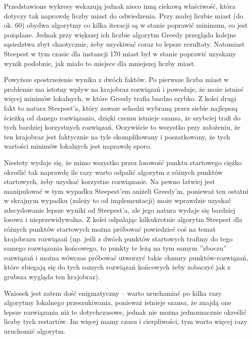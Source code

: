 Przedstawione wykresy wskazują jednak nieco inną ciekawą właściwość, która dotyczy tak naprawdę liczby miast do odwiedzenia. Przy małej liczbie miast (do ok. 60) obydwa algorytmy co kilka iteracji są w stanie poprawić minimum, co jest pożądane. Jednak przy większej ich liczbie algorytm Greedy przegląda kolejne sąsiedztwa zbyt chaotycznie, żeby uzyskiwać coraz to lepsze rezultaty. Natomiast Steepest w tym czasie dla instancji 170 miast był w stanie poprawić uzyskany wynik podobnie, jak miało to miejsce dla mniejszej liczby miast.

Powyższe spostrzeżenie wynika z dwóch faktów. Po pierwsze liczba miast w problemie ma istotny wpływ na krajobraz rozwiązań i powoduje, że może istnieć więcej minimów lokalnych, w które Greedy trafia bardzo szybko. Z kolei drugi fakt to natura Steepest'a, który zawsze schodzi wybraną przez siebie najlepszą ścieżką od danego rozwiązania, dzięki czemu istnieje szansa, że szybciej trafi do tych bardziej korzystnych rozwiązań. Oczywiście to wszystko przy założeniu, że ten krajobraz jest faktycznie na tyle skomplikowany i poszatkowany, że tych wartości minimów lokalnych jest naprawdę sporo.

Niestety wydaje się, że mimo wszystko przez losowość punktu startowego ciężko określić tak naprawdę ile razy warto odpalić algorytm z różnych punktów startowych, żeby uzyskać korzystne rozwiązanie. Na pewno łatwiej jest manipulować w tym wypadku Steepest'em aniżeli Greedy'm, ponieważ ten ostatni w skrajnym wypadku (zależy to od implementacji) może wprawdzie uzyskać zdecydowanie lepsze wyniki od Steepest'a, ale jego natura wydaje się bardziej losowa i nieprzewidywalna. Z kolei odpalając kilkukrotnie algorytm Steepest dla różnych punktów startowych można próbować powiedzieć coś na temat krajobrazu rozwiązań (np. jeśli z dwóch punktów startowych trafimy do tego samego rozwiązania końcowego, to punkty te leżą na tym samym ''zboczu'' rozwiązań i można wówczas próbować utworzyć takie chmury punktów-rozwiązań, które zbiegają się do tych samych rozwiązań końcowych żeby zobaczyć jak z grubsza wygląda ten krajobraz).

Wniosek jest zatem dość enigmatyczny -- warto uruchamiać po kilka razy algorytmy lokalnego przeszukiwania, ponieważ istnieje szansa, że znajdą one lepsze rozwiązania niż te dotychczasowe, jednak nie można jednoznacznie określić liczby tych restartów. Im więcej mamy czasu i cierpliwości, tym warto więcej razy uruchomić algorytm.